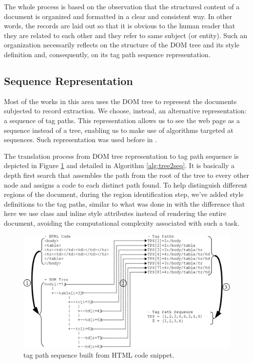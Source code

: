 \documentclass{vldb}
\begin{document}
The whole process is based on the observation that the structured content of a
document is organized and formatted in a clear and consistent way. In other
words, the records are laid out so that it is obvious to the human reader that
they are related to each other and they refer to same subject (or entity). Such
an organization necessarily reflects on the structure of the DOM tree and its
style definition and, consequently, on its tag path sequence representation.

\subsection{Sequence Representation}\label{ss:seq}
Most of the works in this area uses the DOM tree to represent the documents
subjected to record extraction. We choose, instead, an alternative
representation: a sequence of tag paths. This representation allows us to see
the web page as a sequence instead of a tree, enabling us to make use of
algorithms targeted at sequences. Such representation was used before in
\cite{TPC09, SuffixTree12, TPS2013}.

The translation process from DOM tree representation to tag path sequence is
depicted in Figure \ref{fig:tree2seq} and detailed in Algorithm
\ref{alg:tree2seq}. It is basically a depth first search that assembles the path
from the root of the tree to every other node and assigns a code to each
distinct path found. To help distinguish different regions of the document,
during the region identification step, we've added style definitions to the tag
paths, similar to what was done in \cite{clustVX2014} with the difference that
here we use class and inline style attributes instead of rendering the entire
document, avoiding the computational complexity associated with such a task.

\begin{figure}[h]
  \centering
     \includegraphics[width=\columnwidth]{img/tree2seq.jpg}
  \caption{tag path sequence built from HTML code snippet.}
  \label{fig:tree2seq}
\end{figure}
\end{document}
